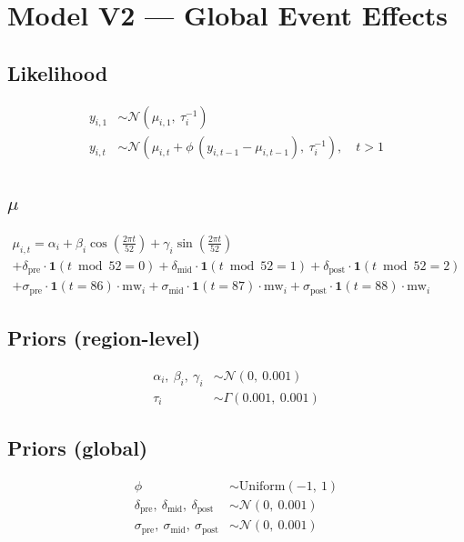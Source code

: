 \documentclass{article}
\begin{document}
\section*{Model V2 --- Global Event Effects}

\subsection*{Likelihood}

\begin{align}
  y_{i,1} &\sim \mathcal{N}(\mu_{i,1},\ \tau_i^{-1}) \\[6pt]
  y_{i,t} &\sim \mathcal{N}\left(\mu_{i,t} + \phi\,(y_{i,t-1} - \mu_{i,t-1}),\ \tau_i^{-1}\right), \quad t > 1
\end{align}

\subsection*{$\mu$}

\begin{multline}
  \mu_{i,t} = \alpha_i
    + \beta_i \cos\left(\tfrac{2\pi t}{52}\right)
    + \gamma_i \sin\left(\tfrac{2\pi t}{52}\right) \\
    + \delta_{\text{pre}} \cdot \mathbf{1}(t \bmod 52 = 0)
    + \delta_{\text{mid}} \cdot \mathbf{1}(t \bmod 52 = 1)
    + \delta_{\text{post}} \cdot \mathbf{1}(t \bmod 52 = 2) \\
    + \sigma_{\text{pre}} \cdot \mathbf{1}(t = 86) \cdot \mathrm{mw}_i
    + \sigma_{\text{mid}} \cdot \mathbf{1}(t = 87) \cdot \mathrm{mw}_i
    + \sigma_{\text{post}} \cdot \mathbf{1}(t = 88) \cdot \mathrm{mw}_i
\end{multline}

\subsection*{Priors (region-level)}

\begin{align}
  \alpha_i,\ \beta_i,\ \gamma_i &\sim \mathcal{N}(0,\ 0.001) \\
  \tau_i &\sim \Gamma(0.001,\ 0.001)
\end{align}

\subsection*{Priors (global)}

\begin{align}
  \phi &\sim \mathrm{Uniform}(-1,\ 1) \\
  \delta_{\text{pre}},\ \delta_{\text{mid}},\ \delta_{\text{post}} &\sim \mathcal{N}(0,\ 0.001) \\
  \sigma_{\text{pre}},\ \sigma_{\text{mid}},\ \sigma_{\text{post}} &\sim \mathcal{N}(0,\ 0.001)
\end{align}
\end{document}
